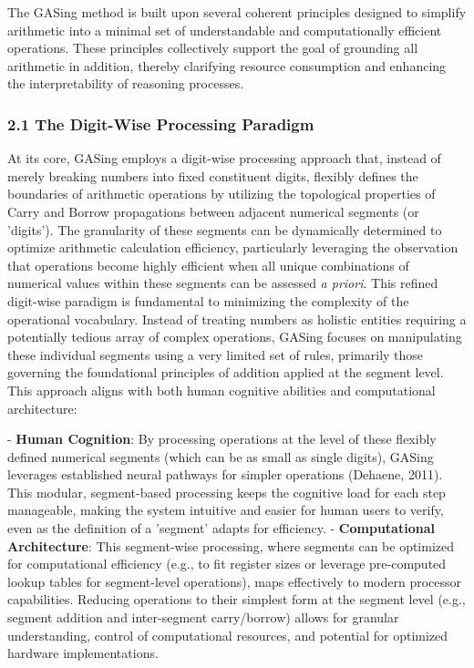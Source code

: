 The GASing method is built upon several coherent principles designed to simplify arithmetic into a minimal set of understandable and computationally efficient operations. These principles collectively support the goal of grounding all arithmetic in addition, thereby clarifying resource consumption and enhancing the interpretability of reasoning processes.
\subsubsection{2.1 The Digit-Wise Processing Paradigm}

At its core, GASing employs a digit-wise processing approach that, instead of merely breaking numbers into fixed constituent digits, flexibly defines the boundaries of arithmetic operations by utilizing the topological properties of Carry and Borrow propagations between adjacent numerical segments (or 'digits'). The granularity of these segments can be dynamically determined to optimize arithmetic calculation efficiency, particularly leveraging the observation that operations become highly efficient when all unique combinations of numerical values within these segments can be assessed \emph{a priori}. This refined digit-wise paradigm is fundamental to minimizing the complexity of the operational vocabulary. Instead of treating numbers as holistic entities requiring a potentially tedious array of complex operations, GASing focuses on manipulating these individual segments using a very limited set of rules, primarily those governing the foundational principles of addition applied at the segment level. This approach aligns with both human cognitive abilities and computational architecture:

- \textbf{Human Cognition}: By processing operations at the level of these flexibly defined numerical segments (which can be as small as single digits), GASing leverages established neural pathways for simpler operations (Dehaene, 2011). This modular, segment-based processing keeps the cognitive load for each step manageable, making the system intuitive and easier for human users to verify, even as the definition of a 'segment' adapts for efficiency.
- \textbf{Computational Architecture}: This segment-wise processing, where segments can be optimized for computational efficiency (e.g., to fit register sizes or leverage pre-computed lookup tables for segment-level operations), maps effectively to modern processor capabilities. Reducing operations to their simplest form at the segment level (e.g., segment addition and inter-segment carry/borrow) allows for granular understanding, control of computational resources, and potential for optimized hardware implementations.

